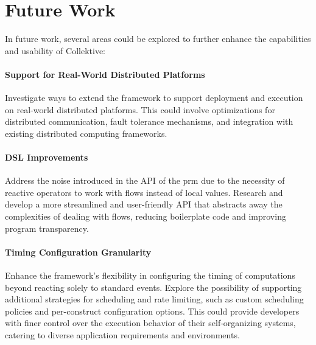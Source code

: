 \section{Future Work}

In future work, several areas could be explored to further enhance the capabilities and usability of Collektive:

\paragraph{Support for Real-World Distributed Platforms}

Investigate ways to extend the framework to support deployment and execution on real-world distributed platforms. This could involve optimizations for distributed communication, fault tolerance mechanisms, and integration with existing distributed computing frameworks.

\paragraph{DSL Improvements}

Address the noise introduced in the API of the \ac{prm} due to the necessity of reactive operators to work with flows instead of local values. Research and develop a more streamlined and user-friendly API that abstracts away the complexities of dealing with flows, reducing boilerplate code and improving program transparency.

\paragraph{Timing Configuration Granularity}

Enhance the framework's flexibility in configuring the timing of computations beyond reacting solely to standard events. Explore the possibility of supporting additional strategies for scheduling and rate limiting, such as custom scheduling policies and per-construct configuration options. This could provide developers with finer control over the execution behavior of their self-organizing systems, catering to diverse application requirements and environments.
